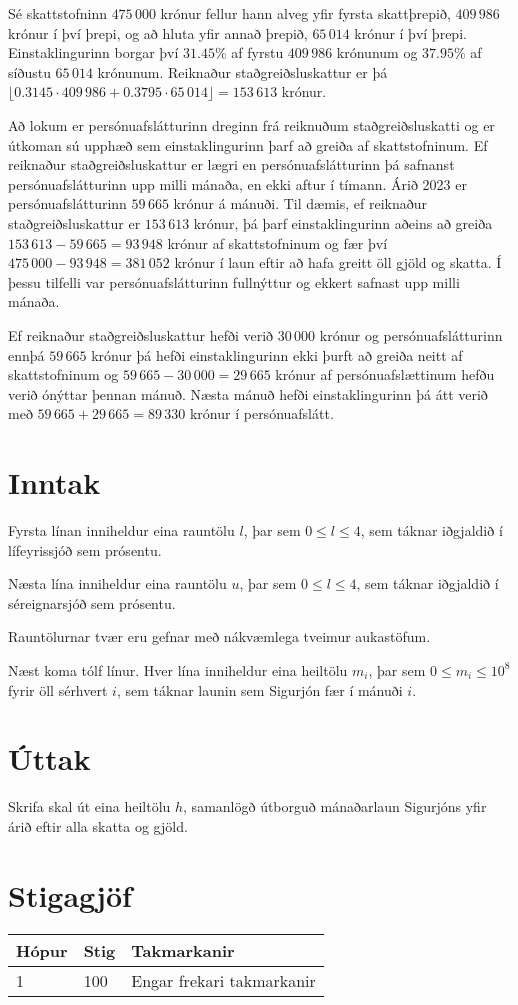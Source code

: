 Sé skattstofninn $475\,000$ krónur fellur hann alveg yfir fyrsta skattþrepið, 
$409\,986$ krónur í því þrepi, og að hluta yfir annað þrepið, $65\,014$ krónur
í því þrepi. Einstaklingurinn borgar því $31.45\%$ af fyrstu $409\,986$
krónunum og $37.95\%$ af síðustu $65\,014$ krónunum. Reiknaður
staðgreiðsluskattur er þá
$\lfloor 0.3145 \cdot 409\,986 + 0.3795 \cdot 65\,014 \rfloor = 153\,613$
krónur.

Að lokum er persónuafslátturinn dreginn frá reiknuðum staðgreiðsluskatti og er
útkoman sú upphæð sem einstaklingurinn þarf að greiða af skattstofninum. Ef
reiknaður staðgreiðsluskattur er lægri en persónuafslátturinn þá safnanst
persónuafslátturinn upp milli mánaða, en ekki aftur í tímann. Árið 2023 er
persónuafslátturinn $59\,665$ krónur á mánuði. Til dæmis, ef reiknaður
staðgreiðsluskattur er $153\,613$ krónur, þá þarf einstaklingurinn
aðeins að greiða $153\,613 - 59\,665 = 93\,948$ krónur af skattstofninum
og fær því $475\,000 - 93\,948 = 381\,052$ krónur í laun eftir að hafa
greitt öll gjöld og skatta. Í þessu tilfelli var persónuafslátturinn fullnýttur
og ekkert safnast upp milli mánaða.

Ef reiknaður staðgreiðsluskattur hefði verið $30\,000$ krónur og
persónuafslátturinn ennþá $59\,665$ krónur þá hefði einstaklingurinn ekki þurft
að greiða neitt af skattstofninum og $59\,665 - 30\,000 = 29\,665$ krónur af
persónuafslættinum hefðu verið ónýttar þennan mánuð. Næsta mánuð hefði
einstaklingurinn þá átt verið með $59\,665 + 29\,665 = 89\,330$ krónur í
persónuafslátt.

\section*{Inntak}
Fyrsta línan inniheldur eina rauntölu $l$, þar sem $0 \leq l \leq 4$, sem táknar iðgjaldið í
lífeyrissjóð sem prósentu.

Næsta lína inniheldur eina rauntölu $u$, þar sem $0 \leq l \leq 4$, sem táknar iðgjaldið í
séreignarsjóð sem prósentu.

Rauntölurnar tvær eru gefnar með nákvæmlega tveimur aukastöfum.

Næst koma tólf línur. Hver lína inniheldur eina heiltölu $m_{i}$, þar sem $0 \leq m_i \leq 10^8$ fyrir öll sérhvert $i$, sem táknar launin sem Sigurjón fær í mánuði $i$.

\section*{Úttak}
Skrifa skal út eina heiltölu $h$, samanlögð útborguð mánaðarlaun Sigurjóns yfir árið
eftir alla skatta og gjöld.

\section*{Stigagjöf}
\begin{tabular}{|l|l|l|}
\hline
Hópur & Stig & Takmarkanir \\ \hline
1     & 100  & Engar frekari takmarkanir\\ \hline
\end{tabular}
